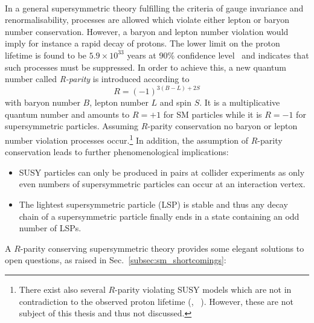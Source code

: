 \\
In a general supersymmetric theory fulfilling the criteria of gauge invariance and renormalisability, processes are allowed which violate either lepton or baryon number conservation. However, a baryon and lepton number violation would imply for instance a rapid decay of protons. The lower limit on the proton lifetime is found to be $5.9 \times 10^{33}$ years at 90\% confidence level~\cite{PhysRevD.90.072005} and indicates that such processes must be suppressed. In order to achieve this, a new quantum number called \textit{R-parity} is introduced according to  
\begin{equation*}
R = (-1)^{3(B-L) + 2S}
\end{equation*}
with baryon number $B$, lepton number $L$ and spin $S$. It is a multiplicative quantum number and amounts to $R= +1$ for SM particles while it is $R = -1$ for supersymmetric particles. Assuming $R$-parity conservation no baryon or lepton number violation processes occur.\footnote{There exist also several $R$-parity violating SUSY models which are not in contradiction to the observed proton lifetime (\cf, \eg~\cite{Martin:1997ns}). However, these are not subject of this thesis and thus not discussed.} In addition, the assumption of $R$-parity conservation leads to further phenomenological implications:
\begin{itemize}
\item SUSY particles can only be produced in pairs at collider experiments as only even numbers of supersymmetric particles can occur at an interaction vertex.
\item The lightest supersymmetric particle (LSP) is stable and thus any decay chain of a supersymmetric particle finally ends in a state containing an odd number of LSPs.
\end{itemize}
A $R$-parity conserving supersymmetric theory provides some elegant solutions to open questions, as raised in Sec.~\ref{subsec:sm_shortcomings}:
